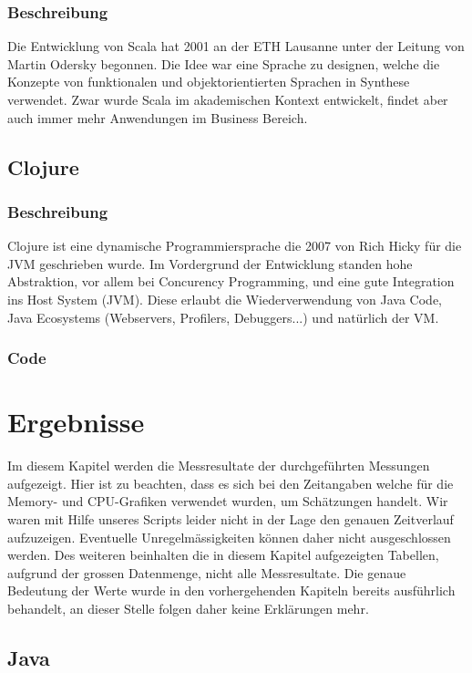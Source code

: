 \documentclass{fancydocument}
\begin{document}
\subsubsection{Beschreibung}

Die Entwicklung von Scala hat 2001 an der ETH Lausanne unter der Leitung von Martin
Odersky begonnen. Die Idee war eine Sprache zu designen, welche die
Konzepte von funktionalen und objektorientierten Sprachen in Synthese
verwendet. Zwar wurde Scala im akademischen Kontext entwickelt, findet
aber auch immer mehr Anwendungen im Business Bereich.

\subsection{Clojure}
\subsubsection{Beschreibung}

Clojure ist eine dynamische Programmiersprache die 2007 von Rich Hicky
für die JVM geschrieben wurde. Im Vordergrund der Entwicklung standen
hohe Abstraktion, vor allem bei Concurency Programming, und eine gute
Integration ins Host System (JVM). Diese erlaubt die Wiederverwendung von
Java Code, Java Ecosystems (Webservers, Profilers, Debuggers...) und natürlich der VM.

\subsubsection{Code}

\section{Ergebnisse}
Im diesem Kapitel werden die Messresultate der durchgeführten Messungen aufgezeigt. Hier ist zu beachten, dass es sich bei den Zeitangaben welche für die Memory- und CPU-Grafiken verwendet wurden, um Schätzungen handelt. Wir waren mit Hilfe unseres Scripts leider nicht in der Lage den genauen Zeitverlauf aufzuzeigen. Eventuelle Unregelmässigkeiten können daher nicht ausgeschlossen werden. Des weiteren beinhalten die in diesem Kapitel aufgezeigten Tabellen, aufgrund der grossen Datenmenge, nicht alle Messresultate. Die genaue Bedeutung der Werte wurde in den vorhergehenden Kapiteln bereits ausführlich behandelt, an dieser Stelle folgen daher keine Erklärungen mehr.

\subsection{Java}
\end{document}
